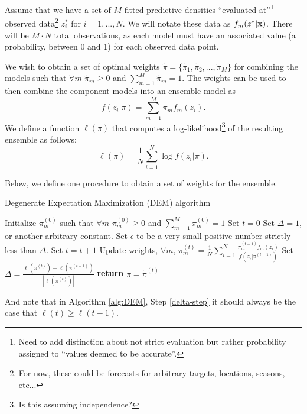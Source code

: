 \documentclass{article}
\begin{document}
Assume that we have a set of $M$ fitted predictive densities ``evaluated at''\footnote{Need to add distinction about not strict evaluation but rather probability assigned to ``values deemed to be accurate''.} observed data\footnote{For now, these could be forecasts for arbitrary targets, locations, seasons, etc... } $z_i^*$ for $i=1, ..., N$. We will notate these data as  $f_{m}(z^*|{\bf x})$. There will be $M\cdot N$ total observations, as each model must have an associated value (a probability, between 0 and 1) for each observed data point.

We wish to obtain a set of optimal weights $\tilde\pi = \{\tilde\pi_1, \tilde\pi_2, ..., \tilde\pi_M\}$ for combining the models such that $\forall m$ $\tilde\pi_m \geq 0$ and $\sum_{m=1}^M \tilde\pi_m=1$.
The weights can be used to then combine the component models into an ensemble model as
$$f(z_i|\pi) = \sum_{m=1}^M \pi_m f_m(z_i).$$
We define a function $\ell(\pi)$ that computes a log-likelihood\footnote{Is this assuming independence?} of the resulting ensemble as follows:
$$\ell(\pi) = \frac{1}{N}\sum_{i=1}^N \log f(z_i|\pi).$$

Below, we define one procedure to obtain a set of weights for the ensemble.

\begin{algorithm}
\caption{Degenerate Expectation Maximization (DEM) algorithm}\label{alg:DEM}
\begin{algorithmic}[1]
\State Initialize $\pi_m^{(0)}$ such that $\forall m$ $\pi_m^{(0)} \geq 0$ and $\sum_{m=1}^M \pi_m^{(0)}=1$ 
\State Set $t=0$
\State Set $\Delta=1$, or another arbitrary constant.
\State Set $\epsilon$ to be a very small positive number strictly less than $\Delta$.
\While{$ \Delta > \epsilon$}%
\State Set $t=t+1$
\State Update weights, $\forall m$, $\pi_m^{(t)} = \frac{1}{N}\sum_{i=1}^N \frac{\pi_m^{(t-1)}f_m(z_i)}{f(z_i|\pi^{(t-1)})}$
\State Set $\Delta =  \frac{\ell(\pi^{(t)}) - \ell(\pi^{(t-1)})}{|\ell(\pi^{(t)})|}$ \label{delta-step}
\EndWhile
\State \textbf{return} $\tilde\pi = \tilde\pi^{(t)}$%
\EndProcedure
\end{algorithmic}
\end{algorithm}

And note that in Algorithm \ref{alg:DEM}, Step \ref{delta-step} it should always be the case that $\ell(t) \geq \ell(t-1)$.
\end{document}

